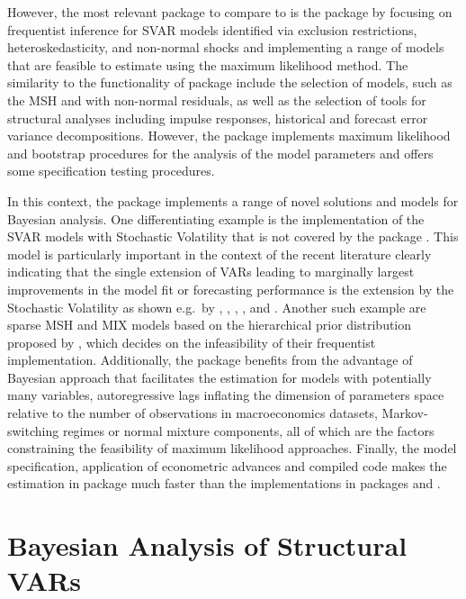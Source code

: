 \documentclass[
  nojss]{jss}
\begin{document}
However, the most relevant package to compare  to is the
package  by \cite{svars} focusing on frequentist inference
for SVAR models identified via exclusion restrictions,
heteroskedasticity, and non-normal shocks and implementing a range of
models that are feasible to estimate using the maximum likelihood
method. The similarity to the functionality of package 
include the selection of models, such as the MSH and with non-normal
residuals, as well as the selection of tools for structural analyses
including impulse responses, historical and forecast error variance
decompositions. However, the package  implements maximum
likelihood and bootstrap procedures for the analysis of the model
parameters and offers some specification testing procedures.

In this context, the  package implements a range of novel
solutions and models for Bayesian analysis. One differentiating example
is the implementation of the SVAR models with Stochastic Volatility that
is not covered by the package . This model is particularly
important in the context of the recent literature clearly indicating
that the single extension of VARs leading to marginally largest
improvements in the model fit or forecasting performance is the
extension by the Stochastic Volatility as shown e.g.~by
\cite{Clark2015}, \cite{Chan2018}, \cite{carriero_large_2019},
\cite{chan2020large}, and \cite{bertsche2022identification}. Another
such example are sparse MSH and MIX models based on the hierarchical
prior distribution proposed by \cite{malsiner2016model}, which decides
on the infeasibility of their frequentist implementation. Additionally,
the package  benefits from the advantage of Bayesian
approach that facilitates the estimation for models with potentially
many variables, autoregressive lags inflating the dimension of
parameters space relative to the number of observations in
macroeconomics datasets, Markov-switching regimes or normal mixture
components, all of which are the factors constraining the feasibility of
maximum likelihood approaches. Finally, the model specification,
application of econometric advances and compiled code makes the
estimation in package  much faster than the implementations
in packages  and .

\section{Bayesian Analysis of Structural VARs}\label{sec:bayes}
\end{document}
